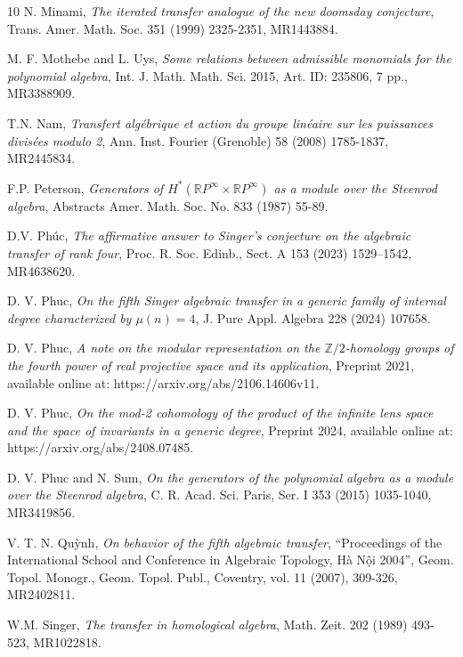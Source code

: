 \documentclass[reqno]{amsart}
\theoremstyle{plain}
\theoremstyle{definition}
\theoremstyle{plain}
\theoremstyle{definition}
\numberwithin{equation}{section}
\begin{document}
\begin{thebibliography}{10}
 N. Minami, \textit{The iterated transfer analogue of the new doomsday conjecture}, Trans. Amer. Math. Soc.  351 (1999) 2325-2351, MR1443884.

 M. F. Mothebe and L. Uys, \textit{Some relations between admissible monomials for the polynomial algebra}, Int. J. Math. Math. Sci. 2015, Art. ID: 235806, 7 pp.,  MR3388909. 

 T.N. Nam, \textit{Transfert alg\'ebrique et action du groupe  lin\'eaire sur les puissances divis\'ees modulo 2},  Ann. Inst. Fourier (Grenoble)   58 (2008)  1785-1837, MR2445834. 
 
  F.P. Peterson, \textit{Generators of $H^*(\mathbb RP^\infty \times \mathbb RP^\infty)$ as a module over the Steenrod algebra},  Abstracts Amer. Math. Soc. No. {833} (1987) 55-89.

 D.V. Phúc, \textit{The affirmative answer to Singer's conjecture on the algebraic transfer of rank four}, Proc. R. Soc. Edinb., Sect. A 153 (2023) 1529–1542, MR4638620.

 D. V. Phuc, \textit{On the fifth Singer algebraic transfer in a generic family of internal degree characterized by $\mu(n) = 4$}, J. Pure Appl. Algebra 228 (2024) 107658.

 D. V. Phuc, \textit{A note on the modular representation on the $\mathbb Z/2$-homology groups of the fourth power of real projective space and its application}, Preprint 2021, available online at: https://arxiv.org/abs/2106.14606v11.

 D. V. Phuc, \textit{On the mod-2 cohomology of the product of the infinite lens space and the space of invariants in a generic degree}, Preprint 2024, available online at: https://arxiv.org/abs/2408.07485.

 D. V. Phuc and N. Sum, \textit{On the generators of the polynomial algebra as a module over the Steenrod algebra}, C. R. Acad. Sci. Paris, Ser. I 353 (2015) 1035-1040,  MR3419856.

 V. T. N. Qu\`ynh, \textit{On behavior of the fifth algebraic transfer}, ``Proceedings of the International School and Conference in Algebraic Topology, H\`a N\^{\d o}i 2004'',  Geom. Topol. Monogr., Geom. Topol. Publ., Coventry, vol. 11 (2007), 309-326, MR2402811.

 W.M. Singer, \textit{The transfer in homological algebra}, Math. Zeit. 202 (1989) 493-523, MR1022818. 


\end{thebibliography}
\end{document}
